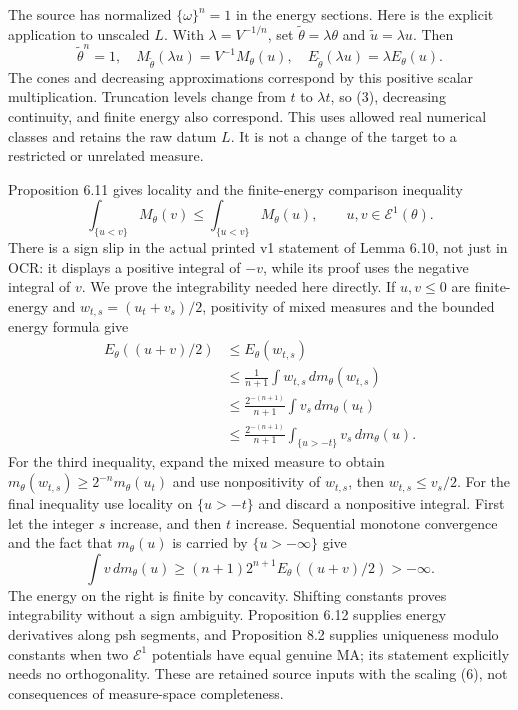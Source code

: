 \documentclass[11pt]{article}
\begin{document}
The source has normalized \(\{\omega\}^n=1\) in the energy sections. Here is the explicit application to unscaled \(L\). With \(\lambda=V^{-1/n}\), set \(\widetilde\theta=\lambda\theta\) and \(\widetilde u=\lambda u\). Then
\[
 \widetilde\theta^n=1,\quad
 M_{\widetilde\theta}(\lambda u)=V^{-1}M_\theta(u),\quad
 E_{\widetilde\theta}(\lambda u)=\lambda E_\theta(u).
 \tag{6}
\]
The cones and decreasing approximations correspond by this positive scalar multiplication. Truncation levels change from \(t\) to \(\lambda t\), so (3), decreasing continuity, and finite energy also correspond. This uses allowed real numerical classes and retains the raw datum \(L\). It is not a change of the target to a restricted or unrelated measure.

Proposition 6.11 gives locality and the finite-energy comparison inequality
\[
 \int_{\{u<v\}}M_\theta(v)\leq
 \int_{\{u<v\}}M_\theta(u),\qquad u,v\in\mathcal E^1(\theta).
 \tag{7}
\]
There is a sign slip in the actual printed v1 statement of Lemma 6.10, not just in OCR: it displays a positive integral of \(-v\), while its proof uses the negative integral of \(v\). We prove the integrability needed here directly. If \(u,v\leq0\) are finite-energy and \(w_{t,s}=(u_t+v_s)/2\), positivity of mixed measures and the bounded energy formula give
\[
 \begin{aligned}
 E_\theta((u+v)/2)&\leq E_\theta(w_{t,s})\\
 &\leq\frac1{n+1}\int w_{t,s}\,dm_\theta(w_{t,s})\\
 &\leq\frac{2^{-(n+1)}}{n+1}\int v_s\,dm_\theta(u_t)\\
 &\leq\frac{2^{-(n+1)}}{n+1}\int_{\{u>-t\}}v_s\,dm_\theta(u).
 \end{aligned}
 \tag{7a}
\]
For the third inequality, expand the mixed measure to obtain \(m_\theta(w_{t,s})\geq2^{-n}m_\theta(u_t)\) and use nonpositivity of \(w_{t,s}\), then \(w_{t,s}\leq v_s/2\). For the final inequality use locality on \(\{u>-t\}\) and discard a nonpositive integral. First let the integer \(s\) increase, and then \(t\) increase. Sequential monotone convergence and the fact that \(m_\theta(u)\) is carried by \(\{u>-\infty\}\) give
\[
 \int v\,dm_\theta(u)\geq (n+1)2^{n+1}E_\theta((u+v)/2)>-\infty.
 \tag{7b}
\]
The energy on the right is finite by concavity. Shifting constants proves integrability without a sign ambiguity. Proposition 6.12 supplies energy derivatives along psh segments, and Proposition 8.2 supplies uniqueness modulo constants when two \(\mathcal E^1\) potentials have equal genuine MA; its statement explicitly needs no orthogonality. These are retained source inputs with the scaling (6), not consequences of measure-space completeness.
\end{document}
